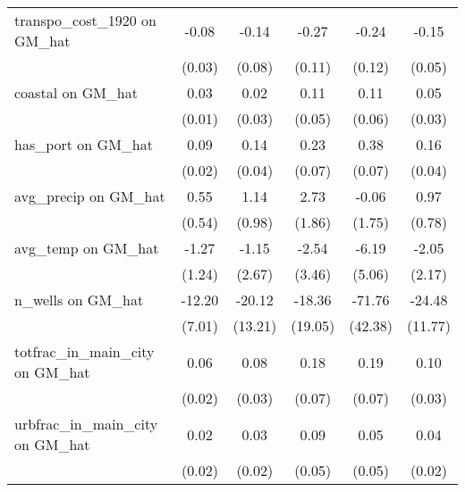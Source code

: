 {\begin{tabular}{l*{5}{c}}
\addlinespace
transpo\_cost\_1920 on GM\_hat&    -0.08\sym{*}  &    -0.14         &    -0.27\sym{*}  &    -0.24\sym{*}  &    -0.15\sym{**} \\
                &   (0.03)         &   (0.08)         &   (0.11)         &   (0.12)         &   (0.05)         \\
\addlinespace
coastal on GM\_hat&     0.03\sym{*}  &     0.02         &     0.11\sym{*}  &     0.11         &     0.05         \\
                &   (0.01)         &   (0.03)         &   (0.05)         &   (0.06)         &   (0.03)         \\
\addlinespace
has\_port on GM\_hat&     0.09\sym{***}&     0.14\sym{***}&     0.23\sym{**} &     0.38\sym{***}&     0.16\sym{***}\\
                &   (0.02)         &   (0.04)         &   (0.07)         &   (0.07)         &   (0.04)         \\
\addlinespace
avg\_precip on GM\_hat&     0.55         &     1.14         &     2.73         &    -0.06         &     0.97         \\
                &   (0.54)         &   (0.98)         &   (1.86)         &   (1.75)         &   (0.78)         \\
\addlinespace
avg\_temp on GM\_hat&    -1.27         &    -1.15         &    -2.54         &    -6.19         &    -2.05         \\
                &   (1.24)         &   (2.67)         &   (3.46)         &   (5.06)         &   (2.17)         \\
\addlinespace
n\_wells on GM\_hat&   -12.20         &   -20.12         &   -18.36         &   -71.76         &   -24.48\sym{*}  \\
                &   (7.01)         &  (13.21)         &  (19.05)         &  (42.38)         &  (11.77)         \\
\addlinespace
totfrac\_in\_main\_city on GM\_hat&     0.06\sym{**} &     0.08\sym{**} &     0.18\sym{**} &     0.19\sym{**} &     0.10\sym{***}\\
                &   (0.02)         &   (0.03)         &   (0.07)         &   (0.07)         &   (0.03)         \\
\addlinespace
urbfrac\_in\_main\_city on GM\_hat&     0.02         &     0.03         &     0.09         &     0.05         &     0.04\sym{*}  \\
                &   (0.02)         &   (0.02)         &   (0.05)         &   (0.05)         &   (0.02)         \\

\end{tabular}}
